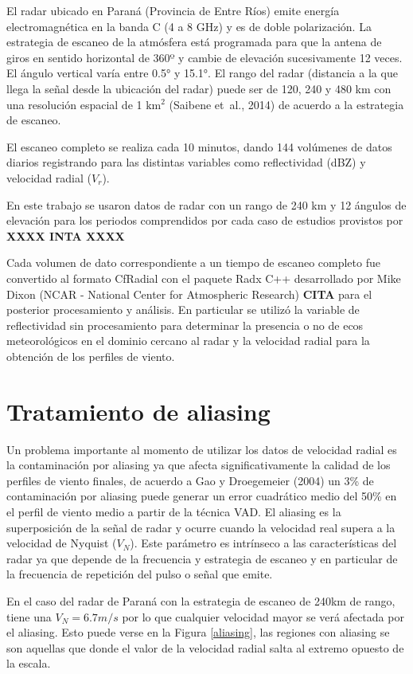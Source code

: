 \documentclass[12pt,spanish,oneside]{book}
\begin{document}
El radar ubicado en Paraná (Provincia de Entre Ríos) emite energía
electromagnética en la banda C (4 a 8 GHz) y es de doble polarización.
La estrategia de escaneo de la atmósfera está programada para que la
antena de giros en sentido horizontal de 360º y cambie de elevación
sucesivamente 12 veces. El ángulo vertical varía entre 0.5° y 15.1°. El
rango del radar (distancia a la que llega la señal desde la ubicación
del radar) puede ser de 120, 240 y 480 km con una resolución espacial de
1 \(\mathrm{km^2}\) (Saibene et~al., 2014) de acuerdo a la estrategia de
escaneo.

El escaneo completo se realiza cada 10 minutos, dando 144 volúmenes de
datos diarios registrando para las distintas variables como
reflectividad (dBZ) y velocidad radial (\(V_r\)).

En este trabajo se usaron datos de radar con un rango de 240 km y 12
ángulos de elevación para los periodos comprendidos por cada caso de
estudios provistos por \textbf{XXXX INTA XXXX}

Cada volumen de dato correspondiente a un tiempo de escaneo completo fue
convertido al formato CfRadial con el paquete Radx C++ desarrollado por
Mike Dixon (NCAR - National Center for Atmospheric Research)
\textbf{CITA} para el posterior procesamiento y análisis. En particular
se utilizó la variable de reflectividad sin procesamiento para
determinar la presencia o no de ecos meteorológicos en el dominio
cercano al radar y la velocidad radial para la obtención de los perfiles
de viento.

\section{Tratamiento de aliasing}\label{tratamiento-de-aliasing}

Un problema importante al momento de utilizar los datos de velocidad
radial es la contaminación por aliasing ya que afecta significativamente
la calidad de los perfiles de viento finales, de acuerdo a Gao y
Droegemeier (2004) un 3\% de contaminación por aliasing puede generar un
error cuadrático medio del 50\% en el perfil de viento medio a partir de
la técnica VAD. El aliasing es la superposición de la señal de radar y
ocurre cuando la velocidad real supera a la velocidad de Nyquist
(\(V_N\)). Este parámetro es intrínseco a las características del radar
ya que depende de la frecuencia y estrategia de escaneo y en particular
de la frecuencia de repetición del pulso o señal que emite.

En el caso del radar de Paraná con la estrategia de escaneo de 240km de
rango, tiene una \(V_N = 6.7 m/s\) por lo que cualquier velocidad mayor
se verá afectada por el aliasing. Esto puede verse en la Figura
\ref{aliasing}, las regiones con aliasing se son aquellas que donde el
valor de la velocidad radial salta al extremo opuesto de la escala.
\end{document}
